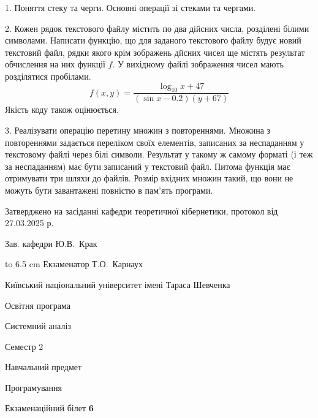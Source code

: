 \documentclass[12pt, ukrainian]{article}
\begin{document}
{%
1. Поняття стеку та черги. Основні операції зі стеками та чергами.%
\par
\vspace{2mm}

2. Кожен рядок текстового файлу містить по два дійсних числа, розділені білими символами.
Написати функцію, що для заданого текстового файлу будує новий текстовий файл, рядки якого крім зображень дйсних чисел ще містять результат обчислення на них функції $f$. У вихідному файлі зображення чисел мають розділятися пробілами. 
$$f(x, y) =\frac{\log_{10} x + 47}{(\sin x - 0.2) (y + 67)}$$ 
Якість коду також оцінюється.

\par
\vspace{2mm}

3. Реалізувати операцію перетину множин з повтореннями. Множина з повтореннями задається переліком своїх елементів, записаних за неспаданням у текстовому файлі через білі символи. Результат у такому ж самому форматі (і теж за неспаданням) має бути записаний у текстовий файл. Питома функція має отримувати три шляхи до файлів. Розмір вхідних множин такий, що вони не можуть бути завантажені повністю в пам’ять програми.

}
{\smallskip\smallskip \begin {scriptsize} Затверджено на засіданні кафедри теоретичної кібернетики, протокол   від   27.03.2025 р.\par\smallskip\smallskip\smallskip\smallskip
{\parbox {6.5 cm} {Зав. кафедри \dotfill Ю.В.~Крак}}\hspace {0.7cm} {\hbox to 6.5 cm { Екзаменатор \dotfill Т.О.~Карнаух}} \end{scriptsize}}
\vspace{2.9cm}
{{\begin {scriptsize}\par
{ \center  Київський національний університет імені Тараса Шевченка \par}
{\parbox {5 cm}{Освітня програма \hfill}{\parbox {7 cm}{Системний аналіз\hfill}}\parbox {6 cm}{\hfill Семестр 2}}\par
{\parbox {5 cm} {Навчальний предмет \hfill}\parbox {7 cm}{Програмування \hfill}\parbox {6cm}{\hfill}\par}\vspace{-15pt} \end{scriptsize}}{\center Екзаменаційний білет \No \textbf { 6 }\par}}
\end{document}
